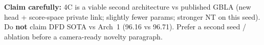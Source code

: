 \documentclass[11pt]{article}
\begin{document}
\vfill
{\small\textbf{Claim carefully:} 4C is a viable second architecture vs published GBLA (new head + score-space private link; slightly fewer params; stronger NT on this seed). Do \textbf{not} claim DFD SOTA vs Arch~1 (96.16 vs 96.71). Prefer a second seed / ablation before a camera-ready novelty paragraph.}
\end{document}
